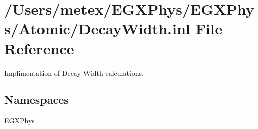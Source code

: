 \hypertarget{_decay_width_8inl}{}\section{/\+Users/metex/\+E\+G\+X\+Phys/\+E\+G\+X\+Phys/\+Atomic/\+Decay\+Width.inl File Reference}
\label{_decay_width_8inl}


Implimentation of Decay Width calculations.  


\subsection*{Namespaces}
\begin{DoxyCompactItemize}
\item 
 \hyperlink{namespace_e_g_x_phys}{E\+G\+X\+Phys}
\end{DoxyCompactItemize}
